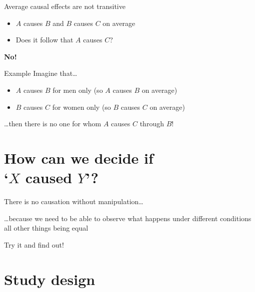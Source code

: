 \begin{frame}{Average causal effects are not transitive}
    \begin{itemize}
        \item $A$ causes $B$ and $B$ causes $C$ \alert{on average}
        \item Does it follow that $A$ causes $C$?
    \end{itemize}
    \vfill\pause
    \begin{center}
        \LARGE%
        \textbf{No!}
    \end{center}
    \begin{block}{Example}
        Imagine that\ldots\vspace{-1ex}
        \begin{itemize}
            \item $A$ causes $B$ for men only (so $A$ causes $B$ on average)
            \item $B$ causes $C$ for women only (so $B$ causes $C$ on average)
        \end{itemize}\vspace{-1ex}
        \ldots then there is no one for whom $A$ causes $C$ through $B$!
    \end{block}
\end{frame}

\section{How can we decide if \\ `$X$ caused $Y$'?}

\begin{frame}{There is no causation without manipulation\ldots}
    \begin{center}
        \large%
        \ldots because we need to be able to observe what happens under
        different conditions \alert{all other things being equal}
    \end{center}
    \vfill\pause
    \begin{center}
        \LARGE%
        Try it and find out!
    \end{center}
\end{frame}

\section{Study design}

